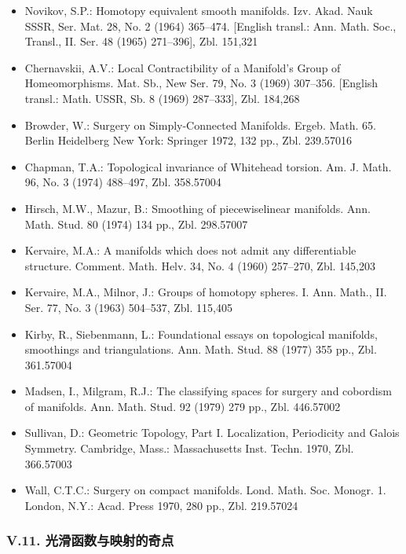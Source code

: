 \begin{itemize}
\item Novikov, S.P.: Homotopy equivalent smooth manifolds. Izv. Akad. Nauk SSSR, Ser. Mat. 28, No. 2 (1964) 365--474. [English transl.: Ann. Math. Soc., Transl., II. Ser. 48 (1965) 271--396], Zbl. 151,321
\item Chernavskii, A.V.: Local Contractibility of a Manifold's Group of Homeomorphisms. Mat. Sb., New Ser. 79, No. 3 (1969) 307--356. [English transl.: Math. USSR, Sb. 8 (1969) 287--333], Zbl. 184,268
\item Browder, W.: Surgery on Simply-Connected Manifolds. Ergeb. Math. 65. Berlin Heidelberg New York: Springer 1972, 132 pp., Zbl. 239.57016
\item Chapman, T.A.: Topological invariance of Whitehead torsion. Am. J. Math. 96, No. 3 (1974) 488--497, Zbl. 358.57004
\item Hirsch, M.W., Mazur, B.: Smoothing of piecewiselinear manifolds. Ann. Math. Stud. 80 (1974) 134 pp., Zbl. 298.57007
\item Kervaire, M.A.: A manifolds which does not admit any differentiable structure. Comment. Math. Helv. 34, No. 4 (1960) 257--270, Zbl. 145,203
\item Kervaire, M.A., Milnor, J.: Groups of homotopy spheres. I. Ann. Math., II. Ser. 77, No. 3 (1963) 504--537, Zbl. 115,405
\item Kirby, R., Siebenmann, L.: Foundational essays on topological manifolds, smoothings and triangulations. Ann. Math. Stud. 88 (1977) 355 pp., Zbl. 361.57004
\item Madsen, I., Milgram, R.J.: The classifying spaces for surgery and cobordism of manifolds. Ann. Math. Stud. 92 (1979) 279 pp., Zbl. 446.57002
\item Sullivan, D.: Geometric Topology, Part I. Localization, Periodicity and Galois Symmetry. Cambridge, Mass.: Massachusetts Inst. Techn. 1970, Zbl. 366.57003
\item Wall, C.T.C.: Surgery on compact manifolds. Lond. Math. Soc. Monogr. 1. London, N.Y.: Acad. Press 1970, 280 pp., Zbl. 219.57024
\end{itemize}

\subsubsection*{V.11. 光滑函数与映射的奇点}

